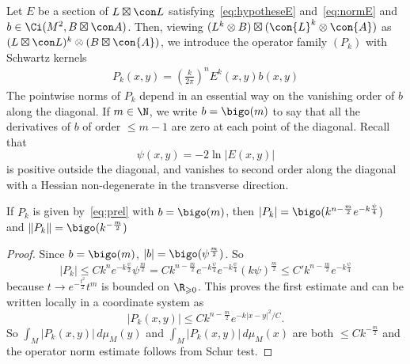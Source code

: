 Let $E$ be a section of $L \boxtimes \con L $ satisfying~\eqref{eq:hypotheseE} and~\eqref{eq:normE} and $b \in \Ci (M^2, B \boxtimes \con A)$. Then, viewing $(L^k \otimes B) \boxtimes (\con{L}^k \otimes \con{A})$ as $(L \boxtimes \con L)^k \otimes (B \boxtimes
\con{A})$, we introduce the operator family $(P_k)$ with Schwartz kernels
\begin{gather}\label{eq:prel}
P_k (x,y) = \left(\frac{k}{2\pi} \right)^n E^k(x,y) b (x,y)
\end{gather}
The pointwise norms of $P_k$ depend in an essential way on the vanishing order of $b$ along the diagonal. If $m \in \N$, we write $b = \bigo (m)$ to say that all the derivatives of $b$ of order $\leqslant m-1$ are zero at each point of the diagonal. Recall that
\[
\psi (x,y) = - 2 \ln |E(x,y)|
\]
is positive outside the
diagonal, and vanishes to second order along the diagonal with a Hessian non-degenerate in the transverse direction.

\begin{lemm}\label{lem:estimate}
If $P_k$ is given by~\eqref{eq:prel} with $b = \bigo (m)$, then  $|P_k | = \bigo (k^{n-\frac{m}{2}} e^{-k
\frac{\psi}{4}})$  and $\| P_k \| = \bigo (k^{- \frac{m}{2}})$
\end{lemm}

\begin{proof}
Since $b = \bigo (m)$, $ | b | = \bigo (\psi ^{\frac{m}{2}}
)$. So 
\[
|P_k | \leqslant C k^n e^{-k \frac{\psi}{2}} \psi ^{\frac{m}{2}}
= C k^{n- \frac{m}{2}} e^{-k \frac{\psi}{4}} e^{-k \frac{\psi}{4}} (k\psi) ^{\frac{m}{2}}
\leqslant C' k^{n- \frac{m}{2}} e^{-k \frac{\psi}{4}}
\]
because $t \rightarrow e^{-\frac{t^2}{2} } t^m$ is bounded on $\R_{\geqslant 0}$. This proves the first estimate and can be written locally in a coordinate system as
\[
|P_k (x,y) | \leqslant C k^{n - \frac{m}{2}} e^{-k|x-y|^2 /C}.
\]
So $\int_M |P_k(x,y)| \, d\mu_M (y)$ and $\int_M |P_k (x,y)|\, d\mu_M (x)$ are both $\leqslant C k^{-\frac{m}{2}}$ and the operator norm estimate follows from Schur test.
\end{proof}


